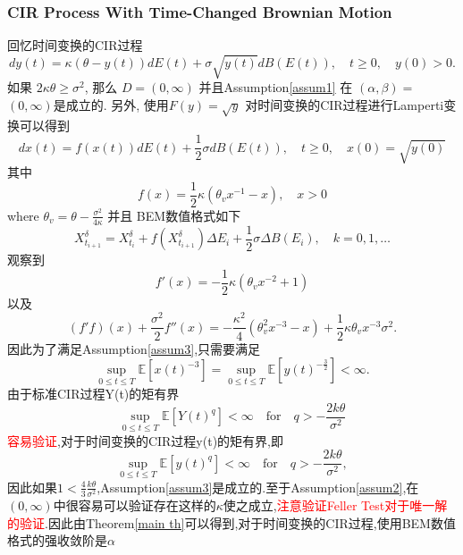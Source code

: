 \documentclass[12pt,final]{article}
\numberwithin{equation}{section}
\numberwithin{figure}{section}
\numberwithin{table}{section}
\theoremstyle{plain}
\theoremstyle{definition}
\theoremstyle{remark}
\begin{document}
	\subsubsection{CIR Process With Time-Changed Brownian Motion}
	回忆时间变换的CIR过程
	$$dy(t)=\kappa(\theta-y(t))dE(t)+\sigma\sqrt{y(t)}dB(E(t)),\quad t\geq0,\quad y(0)>0.$$
	如果 $2\kappa\theta\geq\sigma^{2}$, 那么 $D=(0,\infty)$ 并且Assumption\ref{assum1} 在 $(\alpha,\beta)=$
	$(0,\infty)$是成立的. 
	另外, 使用$F(y)=\sqrt{y}$ 对时间变换的CIR过程进行Lamperti变换可以得到
	\begin{equation}
		dx(t)=f(x(t))dE(t)+\frac12\sigma dB(E(t)),\quad t\geq0,\quad x(0)=\sqrt{y(0)}
	\end{equation}
	其中
	\begin{equation}
		f(x)=\dfrac{1}{2}\kappa\left(\theta_vx^{-1}-x\right),\quad x>0
	\end{equation}
	where $\theta_v=\theta-\frac{\sigma^2}{4\kappa}$ 并且 BEM数值格式如下
	\begin{equation}
		X^\delta_{t_{i+1}}=X^\delta_{t_{i}}+f(X^\delta_{t_{i+1}})\Delta E_i+\frac{1}{2}\sigma\Delta B(E_i),\quad k=0,1,\dots 
	\end{equation}
	观察到
	\begin{equation}
		f'(x)=-\frac{1}{2}\kappa(\theta_vx^{-2}+1)
	\end{equation}
	以及
	\begin{equation}
		(f'f)(x)+\frac{\sigma^2}{2}f''(x)=-\frac{\kappa^2}{4}(\theta_v^2x^{-3}-x)+\frac{1}{2}\kappa\theta_vx^{-3}\sigma^2.
	\end{equation}
	因此为了满足Assumption\ref{assum3},只需要满足
	\begin{equation}
		\sup_{0\leq t\leq T}\mathbb{E}[x(t)^{-3}]=\sup_{0\leq t\leq T}\mathbb{E}[y(t)^{-\frac{3}{2}}] < \infty.
	\end{equation}
	由于标准CIR过程Y(t)的矩有界
	\begin{equation}
		\sup\limits_{0\leq t\leq T}\mathbb{E}[Y(t)^q]<\infty\quad\mathrm{for}\quad q>-\frac{2k\theta}{\sigma^2}
	\end{equation}
	\textcolor{red}{容易验证},对于时间变换的CIR过程y(t)的矩有界,即
	\begin{equation}
		\sup\limits_{0\leq t\leq T}\mathbb{E}[y(t)^q]<\infty\quad\mathrm{for}\quad q>-\frac{2k\theta}{\sigma^2},
	\end{equation}
	因此如果$1 < \frac{4}{3}\frac{k\theta}{\sigma^2}$,Assumption\ref{assum3}是成立的.至于Assumption\ref{assum2},在$(0,\infty)$中很容易可以验证存在这样的$\kappa$使之成立,\textcolor{red}{注意验证Feller Test对于唯一解的验证}.因此由Theorem\ref{main th}可以得到,对于时间变换的CIR过程,使用BEM数值格式的强收敛阶是$\alpha$
\end{document}
